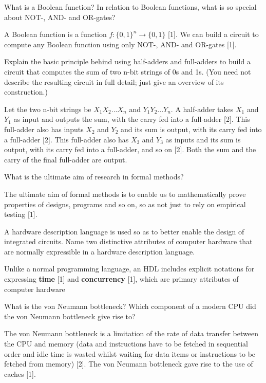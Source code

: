 \documentclass{exam}
\begin{document}
\begin{questions}
\question[2]What is a Boolean function? In relation to Boolean functions, what is
so special about NOT-, AND- and OR-gates?
\begin{solution}[2in]
A Boolean function is a function $f:\{0, 1\}^n \rightarrow \{0, 1\}$ [1]. We can build
a circuit to compute any Boolean function using only NOT-, AND- and
OR-gates [1].
\end{solution}
\newpage
\question[6]Explain the basic principle behind using half-adders and full-adders to
build a circuit that computes the sum of two n-bit strings of 0s and 1s.
(You need not describe the resulting circuit in full detail; just give an
overview of its construction.)
\begin{solution}[2in]
{\small Let the two n-bit strings be $X_1X_2 ... X_n$ and $Y_1Y_2 . . . Y_n$. A half-adder
	takes $X_1$ and $Y_1$ as input and outputs the sum, with the carry fed into
	a full-adder [2]. This full-adder also has inputs $X_2$ and $Y_2$ and its sum
	is output, with its carry fed into a full-adder [2]. This full-adder also
	has $X_3$ and $Y_3$ as inputs and its sum is output, with its carry fed into
	a full-adder, and so on [2]. Both the sum and the carry of the final
	full-adder are output.}
\end{solution}

\question[1]What is the ultimate aim of research in formal methods?
\begin{solution}[2in]
The ultimate aim of formal methods is to enable us to mathematically
prove properties of designs, programs and so on, so as not just to rely
on empirical testing [1].
\end{solution}

\question[2]A hardware description language is used so as to better enable the
design of integrated circuits. Name two distinctive attributes of computer
hardware that are normally expressible in a hardware description
language.
\begin{solution}[2in]
Unlike a normal programming language, an HDL includes explicit notations
for expressing \textbf{time} [1] and \textbf{concurrency} [1], which are primary
attributes of computer hardware
\end{solution}

\question[3]What is the von Neumann bottleneck? Which component of a modern
CPU did the von Neumann bottleneck give rise to?
\begin{solution}[2in]
The von Neumann bottleneck is a limitation of the rate of data transfer
between the CPU and memory (data and instructions have to be
fetched in sequential order and idle time is wasted whilst waiting for
data items or instructions to be fetched from memory) [2]. The von
Neumann bottleneck gave rise to the use of caches [1].
\end{solution}



\end{questions}
\end{document}
